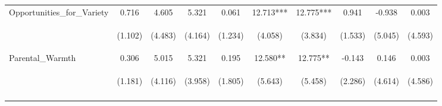 \begin{tabular}{lccccccccc}
\noalign{\smallskip}Opportunities_for_Variety & 0.716 & 4.605 & 5.321 & 0.061 & 12.713*** & 12.775*** & 0.941 & -0.938 & 0.003\\
 & \begin{footnotesize}(1.102)\end{footnotesize} & \begin{footnotesize}(4.483)\end{footnotesize} & \begin{footnotesize}(4.164)\end{footnotesize} & \begin{footnotesize}(1.234)\end{footnotesize} & \begin{footnotesize}(4.058)\end{footnotesize} & \begin{footnotesize}(3.834)\end{footnotesize} & \begin{footnotesize}(1.533)\end{footnotesize} & \begin{footnotesize}(5.045)\end{footnotesize} & \begin{footnotesize}(4.593)\end{footnotesize}\\
\noalign{\smallskip}Parental_Warmth & 0.306 & 5.015 & 5.321 & 0.195 & 12.580** & 12.775** & -0.143 & 0.146 & 0.003\\
 & \begin{footnotesize}(1.181)\end{footnotesize} & \begin{footnotesize}(4.116)\end{footnotesize} & \begin{footnotesize}(3.958)\end{footnotesize} & \begin{footnotesize}(1.805)\end{footnotesize} & \begin{footnotesize}(5.643)\end{footnotesize} & \begin{footnotesize}(5.458)\end{footnotesize} & \begin{footnotesize}(2.286)\end{footnotesize} & \begin{footnotesize}(4.614)\end{footnotesize} & \begin{footnotesize}(4.586)\end{footnotesize}\\
\noalign{\smallskip}\hline\end{tabular}\\
